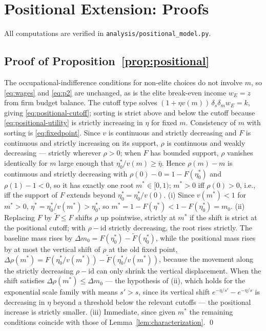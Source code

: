\documentclass[12pt,letterpaper]{article}
\theoremstyle{definition}
\begin{document}
\section{Positional Extension: Proofs}\label{app:positional}

All computations are verified in \texttt{analysis/positional\_model.py}.

\subsection{Proof of Proposition~\ref{prop:positional}} The occupational-indifference conditions for non-elite choices do not involve $m$, so \eqref{eq:wages} and \eqref{eq:p2} are unchanged, as is the elite break-even income $w_E=z$ from firm budget balance.
The cutoff type solves $(1+\eta v(m))\,\delta_s\delta_m w_E = k$, giving \eqref{eq:positional-cutoff}; sorting is strict above and below the cutoff because \eqref{eq:positional-utility} is strictly increasing in $\eta$ for fixed $m$.
Consistency of $m$ with sorting is \eqref{eq:fixedpoint}.
Since $v$ is continuous and strictly decreasing and $F$ is continuous and strictly increasing on its support, $\rho$ is continuous and weakly decreasing --- strictly wherever $\rho>0$; when $F$ has bounded support, $\rho$ vanishes identically for $m$ large enough that $\eta^\ast_0/v(m)\geq\bar\eta$.
Hence $\rho(m)-m$ is continuous and strictly decreasing with $\rho(0)-0=1-F(\eta^\ast_0)$ and $\rho(1)-1<0$, so it has exactly one root $m^\ast\in[0,1)$; $m^\ast>0$ iff $\rho(0)>0$, i.e., iff the support of $F$ extends beyond $\eta^\ast_0=\eta^\ast_0/v(0)$.
(i) Since $v(m^\ast)<1$ for $m^\ast>0$, $\eta^\ast=\eta^\ast_0/v(m^\ast)>\eta^\ast_0$, so $m^\ast=1-F(\eta^\ast)<1-F(\eta^\ast_0)=m_0$.
(ii) Replacing $F$ by $\tilde F\leq F$ shifts $\rho$ up pointwise, strictly at $m^\ast$ if the shift is strict at the positional cutoff; with $\rho-\mathrm{id}$ strictly decreasing, the root rises strictly.
The baseline mass rises by $\Delta m_0 = F(\eta^\ast_0)-\tilde F(\eta^\ast_0)$, while the positional mass rises by at most the vertical shift of $\rho$ at the old fixed point, $\Delta\rho(m^\ast) = F(\eta^\ast_0/v(m^\ast))-\tilde F(\eta^\ast_0/v(m^\ast))$, because the movement along the strictly decreasing $\rho-\mathrm{id}$ can only shrink the vertical displacement.
When the shift satisfies $\Delta\rho(m^\ast)\leq\Delta m_0$ --- the hypothesis of (ii), which holds for the exponential scale family with means $s'>s$, since its vertical shift $e^{-\eta/s'}-e^{-\eta/s}$ is decreasing in $\eta$ beyond a threshold below the relevant cutoffs --- the positional increase is strictly smaller.
(iii) Immediate, since given $m^\ast$ the remaining conditions coincide with those of Lemma~\ref{lem:characterization}.
\qed
\end{document}
